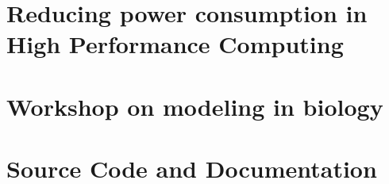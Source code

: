\documentclass{easychithesis}
\begin{document}
\chapter{Reducing power consumption in High Performance Computing}


\chapter{Workshop on modeling in biology}


\chapter{Source Code and Documentation}

%
%

\singlespacing
\pagebreak


\end{document}

